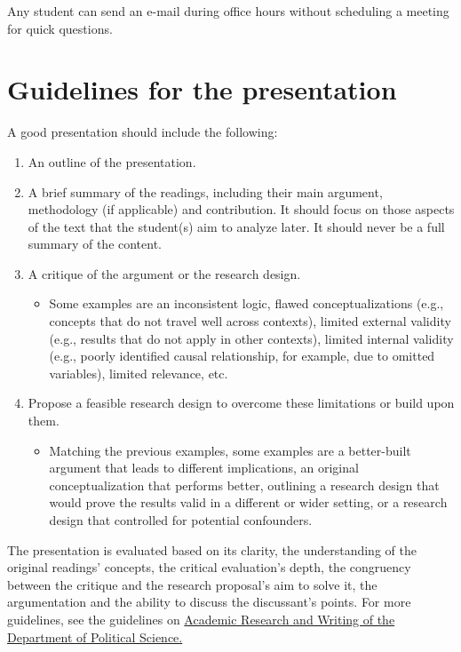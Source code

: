 \documentclass[
  12pt,
]{article}
\providecommand{\tightlist}{%
  \setlength{\itemsep}{0pt}\setlength{\parskip}{0pt}}
\begin{document}
Any student can send an e-mail during office hours without scheduling a
meeting for quick questions.

\hypertarget{guidelines-for-the-presentation}{%
\section{Guidelines for the
presentation}\label{guidelines-for-the-presentation}}

A good presentation should include the following:

\begin{enumerate}
\def\labelenumi{\arabic{enumi}.}
\item
  An outline of the presentation.
\item
  A brief summary of the readings, including their main argument,
  methodology (if applicable) and contribution. It should focus on those
  aspects of the text that the student(s) aim to analyze later. It
  should never be a full summary of the content.
\item
  A critique of the argument or the research design.

  \begin{itemize}
  \tightlist
  \item
    Some examples are an inconsistent logic, flawed conceptualizations
    (e.g., concepts that do not travel well across contexts), limited
    external validity (e.g., results that do not apply in other
    contexts), limited internal validity (e.g., poorly identified causal
    relationship, for example, due to omitted variables), limited
    relevance, etc.
  \end{itemize}
\item
  Propose a feasible research design to overcome these limitations or
  build upon them.

  \begin{itemize}
  \tightlist
  \item
    Matching the previous examples, some examples are a better-built
    argument that leads to different implications, an original
    conceptualization that performs better, outlining a research design
    that would prove the results valid in a different or wider setting,
    or a research design that controlled for potential confounders.
  \end{itemize}
\end{enumerate}

The presentation is evaluated based on its clarity, the understanding of
the original readings' concepts, the critical evaluation's depth, the
congruency between the critique and the research proposal's aim to solve
it, the argumentation and the ability to discuss the discussant's
points. For more guidelines, see the guidelines on
\href{https://www.unilu.ch/fileadmin/fakultaeten/ksf/institute/polsem/Dok/Studium/2016-Jan_Guidelines_Booklet_engl.pdf}{Academic
Research and Writing of the Department of Political Science.}
\end{document}
